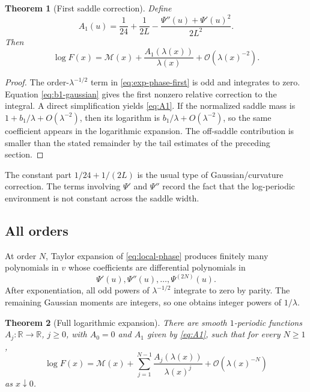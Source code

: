 \documentclass[11pt,oneside]{article}
\newtheorem{theorem}{Theorem}[section]
\theoremstyle{definition}
\theoremstyle{remark}
\newcommand{\R}{\mathbb R}
\newcommand{\bigO}{\mathcal O}
\begin{document}
\begin{theorem}[First saddle correction]
Define
\begin{equation}
 A_1(u)=\frac1{24}+\frac1{2L}
 -\frac{\Psi''(u)+\Psi'(u)^2}{2L^2}.                       \label{eq:A1}
\end{equation}
Then
\begin{equation}
 \boxed{
 \log F(x)=\mathcal M(x)+\frac{A_1(\lambda(x))}{\lambda(x)}
 +\bigO\!\left(\lambda(x)^{-2}\right).}                  \label{eq:first-corrected-asymptotic}
\end{equation}
\end{theorem}

\begin{proof}
The order-$\lambda^{-1/2}$ term in \eqref{eq:exp-phase-first} is odd and integrates to zero.
Equation \eqref{eq:b1-gaussian} gives the first nonzero relative correction to the integral.
A direct simplification yields \eqref{eq:A1}.  If the normalized saddle mass is
$1+b_1/\lambda+O(\lambda^{-2})$, then its logarithm is
$b_1/\lambda+O(\lambda^{-2})$, so the same coefficient appears in the logarithmic expansion.
The off-saddle contribution is smaller than the stated remainder by the tail estimates of the
preceding section.
\end{proof}

The constant part $1/24+1/(2L)$ is the usual type of Gaussian/curvature correction.  The
terms involving $\Psi'$ and $\Psi''$ record the fact that the log-periodic environment is not
constant across the saddle width.

\subsection{All orders}

At order $N$, Taylor expansion of \eqref{eq:local-phase} produces finitely many polynomials
in $v$ whose coefficients are differential polynomials in
\begin{equation*}
 \Psi'(u),\Psi''(u),\ldots,\Psi^{(2N)}(u).
\end{equation*}
After exponentiation, all odd powers of $\lambda^{-1/2}$ integrate to zero by parity.  The
remaining Gaussian moments are integers, so one obtains integer powers of $1/\lambda$.

\begin{theorem}[Full logarithmic expansion]
There are smooth $1$-periodic functions $A_j:\R\to\R$, $j\ge0$, with
$A_0=0$ and $A_1$ given by \eqref{eq:A1}, such that for every $N\ge1$,
\begin{equation}
 \boxed{
 \log F(x)=\mathcal M(x)+
   \sum_{j=1}^{N-1}\frac{A_j(\lambda(x))}{\lambda(x)^j}
   +\bigO\!\left(\lambda(x)^{-N}\right)}                 \label{eq:all-orders-log}
\end{equation}
as $x\downarrow0$.
\end{theorem}
\end{document}
